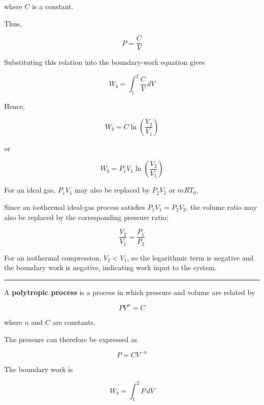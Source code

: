 \documentclass[12pt]{article}
\newcommand{\mysubsection}[2]{%
    \vspace{5px}
    \noindent{\headingfont\large #1\space #2\par}
    \vspace{4pt}
    \hrule
    \vspace{15pt}
}
\begin{document}
where $C$ is a constant.

Thus,

\begin{equation*}
P=\frac{C}{V}
\end{equation*}

Substituting this relation into the boundary-work equation gives

\begin{equation*}
W_b=\int_1^2\frac{C}{V}\,dV
\end{equation*}

Hence,

\begin{equation*}
W_b=C\ln\left(\frac{V_2}{V_1}\right)
\end{equation*}

or

\begin{equation*}
W_b=P_1V_1\ln\left(\frac{V_2}{V_1}\right)
\end{equation*}

For an ideal gas, $P_1V_1$ may also be replaced by $P_2V_2$ or $mRT_0$.

Since an isothermal ideal-gas process satisfies $P_1V_1=P_2V_2$, the volume ratio may also be replaced by the corresponding pressure ratio:

\begin{equation*}
\frac{V_2}{V_1}=\frac{P_1}{P_2}
\end{equation*}

For an isothermal compression, $V_2<V_1$, so the logarithmic term is negative and the boundary work is negative, indicating work input to the system.

\mysubsection{}{Polytropic Process}

A \textbf{polytropic process} is a process in which pressure and volume are related by

\begin{equation*}
PV^n=C
\end{equation*}

where $n$ and $C$ are constants.

The pressure can therefore be expressed as

\begin{equation*}
P=CV^{-n}
\end{equation*}

The boundary work is

\begin{equation*}
W_b=\int_1^2P\,dV
\end{equation*}
\end{document}

